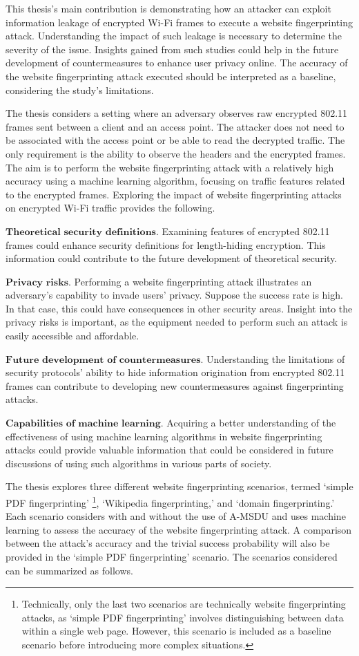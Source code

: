 This thesis's main contribution is demonstrating how an attacker can exploit information leakage of encrypted Wi-Fi frames to execute a website fingerprinting attack. Understanding the impact of such leakage is necessary to determine the severity of the issue. Insights gained from such studies could help in the future development of countermeasures to enhance user privacy online. The accuracy of the website fingerprinting attack executed should be interpreted as a baseline, considering the study's limitations.

The thesis considers a setting where an adversary observes raw encrypted 802.11 frames sent between a client and an access point. The attacker does not need to be associated with the access point or be able to read the decrypted traffic. The only requirement is the ability to observe the headers and the encrypted frames. The aim is to perform the website fingerprinting attack with a relatively high accuracy using a machine learning algorithm, focusing on traffic features related to the encrypted frames. Exploring the impact of website fingerprinting attacks on encrypted Wi-Fi traffic provides the following.

$\textbf{Theoretical security definitions}$. Examining features of encrypted 802.11 frames could enhance security definitions for length-hiding encryption. This information could contribute to the future development of theoretical security.

$\textbf{Privacy risks}$. Performing a website fingerprinting attack illustrates an adversary's capability to invade users' privacy. Suppose the success rate is high. In that case, this could have consequences in other security areas. Insight into the privacy risks is important, as the equipment needed to perform such an attack is easily accessible and affordable.

$\textbf{Future development of countermeasures}$. Understanding the limitations of security protocols' ability to hide information origination from encrypted 802.11 frames can contribute to developing new countermeasures against fingerprinting attacks.

$\textbf{Capabilities of machine learning}$. Acquiring a better understanding of the effectiveness of using machine learning algorithms in website fingerprinting attacks could provide valuable information that could be considered in future discussions of using such algorithms in various parts of society.
  
The thesis explores three different website fingerprinting scenarios, termed `simple PDF fingerprinting' \footnote{Technically, only the last two scenarios are technically website fingerprinting attacks, as `simple PDF fingerprinting' involves distinguishing between data within a single web page. However, this scenario is included as a baseline scenario before introducing more complex situations.}, `Wikipedia fingerprinting,' and `domain fingerprinting.' Each scenario considers with and without the use of A-MSDU and uses machine learning to assess the accuracy of the website fingerprinting attack. A comparison between the attack's accuracy and the trivial success probability will also be provided in the `simple PDF fingerprinting' scenario. The scenarios considered can be summarized as follows.

